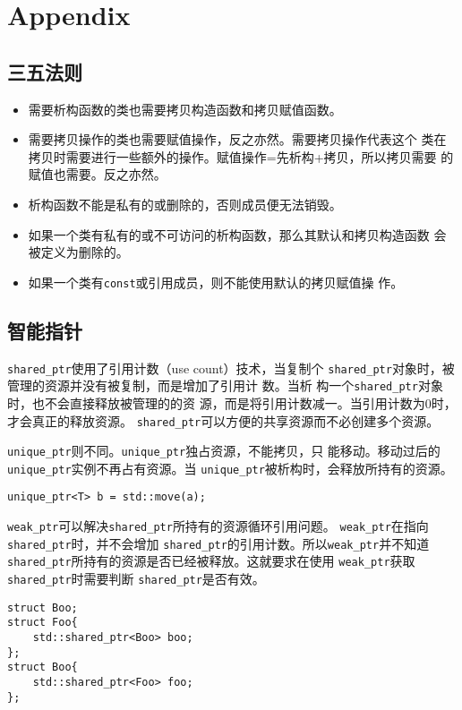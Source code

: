 \clearpage
\section{Appendix}

\subsection{三五法则}
\label{sec:ThreeFive}

\begin{itemize}
\item 需要析构函数的类也需要拷贝构造函数和拷贝赋值函数。
\item  需要拷贝操作的类也需要赋值操作，反之亦然。需要拷贝操作代表这个
  类在拷贝时需要进行一些额外的操作。赋值操作=先析构+拷贝，所以拷贝需要
  的赋值也需要。反之亦然。
\item 析构函数不能是私有的或删除的，否则成员便无法销毁。
\item 如果一个类有私有的或不可访问的析构函数，那么其默认和拷贝构造函数
  会被定义为删除的。
\item 如果一个类有\texttt{const}或引用成员，则不能使用默认的拷贝赋值操
  作。 
\end{itemize}
\subsection{智能指针}
\label{sec:SmartPointer}
\texttt{shared\_ptr}使用了引用计数（use count）技术，当复制个
\texttt{shared\_ptr}对象时，被管理的资源并没有被复制，而是增加了引用计
数。当析 构一个\texttt{shared\_ptr}对象时，也不会直接释放被管理的的资
源，而是将引用计数减一。当引用计数为0时，才会真正的释放资源。
\texttt{shared\_ptr}可以方便的共享资源而不必创建多个资源。

\texttt{unique\_ptr}则不同。\texttt{unique\_ptr}独占资源，不能拷贝，只
能移动。移动过后的\texttt{unique\_ptr}实例不再占有资源。当
\texttt{unique\_ptr}被析构时，会释放所持有的资源。
\begin{verbatim}
unique_ptr<T> b = std::move(a);
\end{verbatim}
\texttt{weak\_ptr}可以解决\texttt{shared\_ptr}所持有的资源循环引用问题。
\texttt{weak\_ptr}在指向\texttt{shared\_ptr}时，并不会增加
\texttt{shared\_ptr}的引用计数。所以\texttt{weak\_ptr}并不知道
\texttt{shared\_ptr}所持有的资源是否已经被释放。这就要求在使用
\texttt{weak\_ptr}获取\texttt{shared\_ptr}时需要判断
\texttt{shared\_ptr}是否有效。

\begin{verbatim}
struct Boo;
struct Foo{
    std::shared_ptr<Boo> boo;
};
struct Boo{
    std::shared_ptr<Foo> foo;
};
\end{verbatim}

